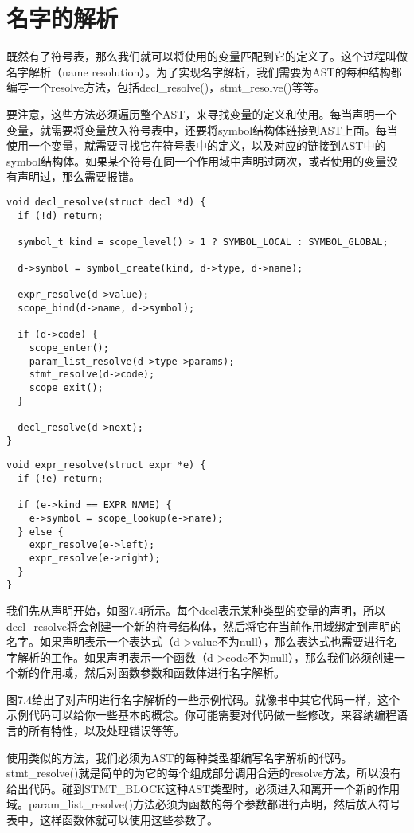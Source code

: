 \documentclass[cn,11pt,chinese]{elegantbook}
\begin{document}
\section{名字的解析}

既然有了符号表，那么我们就可以将使用的变量匹配到它的定义了。这个过程叫做名字解析（name resolution）。为了实现名字解析，我们需要为AST的每种结构都编写一个resolve方法，包括decl\_resolve()，stmt\_resolve()等等。

要注意，这些方法必须遍历整个AST，来寻找变量的定义和使用。每当声明一个变量，就需要将变量放入符号表中，还要将symbol结构体链接到AST上面。每当使用一个变量，就需要寻找它在符号表中的定义，以及对应的链接到AST中的symbol结构体。如果某个符号在同一个作用域中声明过两次，或者使用的变量没有声明过，那么需要报错。

\begin{verbatim}
void decl_resolve(struct decl *d) {
  if (!d) return;
    
  symbol_t kind = scope_level() > 1 ? SYMBOL_LOCAL : SYMBOL_GLOBAL;
  
  d->symbol = symbol_create(kind, d->type, d->name);
    
  expr_resolve(d->value);
  scope_bind(d->name, d->symbol);
    
  if (d->code) {
    scope_enter();
    param_list_resolve(d->type->params);
    stmt_resolve(d->code);
    scope_exit();
  }
    
  decl_resolve(d->next);
}
\end{verbatim}

\begin{verbatim}
void expr_resolve(struct expr *e) {
  if (!e) return;
    
  if (e->kind == EXPR_NAME) {
    e->symbol = scope_lookup(e->name);
  } else {
    expr_resolve(e->left);
    expr_resolve(e->right);
  }
}
\end{verbatim}

我们先从声明开始，如图7.4所示。每个decl表示某种类型的变量的声明，所以decl\_resolve将会创建一个新的符号结构体，然后将它在当前作用域绑定到声明的名字。如果声明表示一个表达式（d->value不为null），那么表达式也需要进行名字解析的工作。如果声明表示一个函数（d->code不为null），那么我们必须创建一个新的作用域，然后对函数参数和函数体进行名字解析。

图7.4给出了对声明进行名字解析的一些示例代码。就像书中其它代码一样，这个示例代码可以给你一些基本的概念。你可能需要对代码做一些修改，来容纳编程语言的所有特性，以及处理错误等等。

使用类似的方法，我们必须为AST的每种类型都编写名字解析的代码。stmt\_resolve()就是简单的为它的每个组成部分调用合适的resolve方法，所以没有给出代码。碰到STMT\_BLOCK这种AST类型时，必须进入和离开一个新的作用域。param\_list\_resolve()方法必须为函数的每个参数都进行声明，然后放入符号表中，这样函数体就可以使用这些参数了。
\end{document}
